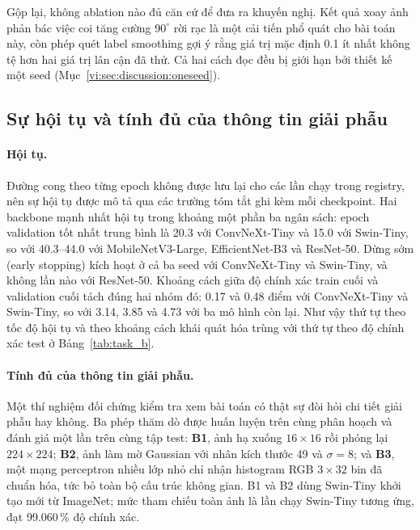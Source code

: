 Gộp lại, không ablation nào đủ căn cứ để đưa ra khuyến nghị. Kết quả xoay ảnh
phản bác việc coi tăng cường $90^\circ$ rời rạc là một cải tiến phổ quát cho
bài toán này, còn phép quét label smoothing gợi ý rằng giá trị mặc định 0.1 ít
nhất không tệ hơn hai giá trị lân cận đã thử. Cả hai cách đọc đều bị giới hạn
bởi thiết kế một seed (Mục~\ref{vi:sec:discussion:oneseed}).

\subsection{Sự hội tụ và tính đủ của thông tin giải phẫu}
\label{vi:sec:results:convergence}

\paragraph{Hội tụ.} Đường cong theo từng epoch không được lưu lại cho các lần
chạy trong registry, nên sự hội tụ được mô tả qua các trường tóm tắt ghi kèm
mỗi checkpoint. Hai backbone mạnh nhất hội tụ trong khoảng một phần ba ngân
sách: epoch validation tốt nhất trung bình là 20.3 với ConvNeXt-Tiny và 15.0
với Swin-Tiny, so với 40.3--44.0 với MobileNetV3-Large, EfficientNet-B3 và
ResNet-50. Dừng sớm (early stopping) kích hoạt ở cả ba seed với ConvNeXt-Tiny
và Swin-Tiny, và không lần nào với ResNet-50. Khoảng cách giữa độ chính xác
train cuối và validation cuối tách đúng hai nhóm đó: 0.17 và 0.48 điểm với
ConvNeXt-Tiny và Swin-Tiny, so với 3.14, 3.85 và 4.73 với ba mô hình còn lại.
Như vậy thứ tự theo tốc độ hội tụ và theo khoảng cách khái quát hóa trùng với
thứ tự theo độ chính xác test ở Bảng~\ref{tab:task_b}.

\paragraph{Tính đủ của thông tin giải phẫu.} Một thí nghiệm đối chứng kiểm tra
xem bài toán có thật sự đòi hỏi chi tiết giải phẫu hay không. Ba phép thăm dò
được huấn luyện trên cùng phân hoạch và đánh giá một lần trên cùng tập test:
\textbf{B1}, ảnh hạ xuống $16\times16$ rồi phóng lại $224\times224$;
\textbf{B2}, ảnh làm mờ Gaussian với nhân kích thước 49 và $\sigma=8$; và
\textbf{B3}, một mạng perceptron nhiều lớp nhỏ chỉ nhận histogram RGB
$3\times32$ bin đã chuẩn hóa, tức bỏ toàn bộ cấu trúc không gian. B1 và B2 dùng
Swin-Tiny khởi tạo mới từ ImageNet; mức tham chiếu toàn ảnh là lần chạy
Swin-Tiny tương ứng, đạt 99.060\,\% độ chính xác.

